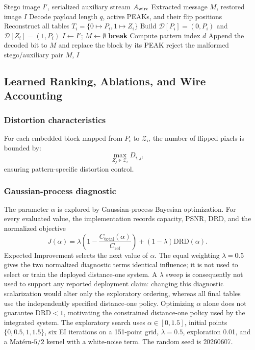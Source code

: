 \documentclass[a4paper,fleqn]{cas-dc}
\begin{document}
\begin{algorithm*}[t]
\caption{Deterministic Extraction and Exact Restoration}
\label{alg:extraction}
\begin{algorithmic}[1]
\Require Stego image $I'$, serialized auxiliary stream $A_{\rm wire}$
\Ensure Extracted message $M$, restored image $I$
\State Decode payload length $q$, active PEAKs, and their flip positions
\State Reconstruct all tables $T_i=\{0\mapsto P_i,1\mapsto Z_i\}$
\State Build $\mathcal D[P_i]=(0,P_i)$ and $\mathcal D[Z_i]=(1,P_i)$
\State $I\gets I'$; $M\gets\emptyset$
        \State \textbf{break}
    \EndIf
    \State Compute pattern index $d$
        \State Append the decoded bit to $M$ and replace the block by its PEAK
    \EndIf
\EndFor
{}
    \State reject the malformed stego/auxiliary pair
\EndIf
\State \Return $M$, $I$
\end{algorithmic}
\end{algorithm*}

\subsection{Learned Ranking, Ablations, and Wire Accounting}

\subsubsection*{Distortion characteristics}

For each embedded block mapped from $P_i$ to $\mathcal{Z}_i$, the number of flipped pixels is bounded by:
\[
\max_{Z_j \in \mathcal{Z}_i} D_{i,j},
\]
ensuring pattern-specific distortion control.

\subsubsection*{Gaussian-process diagnostic}
\label{subsec:param_optim}

The parameter $\alpha$ is explored by Gaussian-process Bayesian optimization.
For every evaluated value, the implementation records capacity, PSNR, DRD, and
the normalized objective
\[
J(\alpha)=\lambda\left(1-\frac{C_{\text{total}}(\alpha)}{C_{\mathrm{ref}}}\right)
+(1-\lambda)\mathrm{DRD}(\alpha).
\]
Expected Improvement selects the next value of $\alpha$. The equal weighting
$\lambda=0.5$ gives the two normalized diagnostic terms identical influence;
it is not used to select or train the deployed distance-one system. A
$\lambda$ sweep is consequently not used to support any reported deployment
claim: changing this diagnostic scalarization would alter only the exploratory
ordering, whereas all final tables use the independently specified
distance-one policy. Optimizing $\alpha$ alone does not guarantee
$\mathrm{DRD}<1$, motivating the constrained distance-one policy used by the
integrated system. The exploratory search uses
$\alpha\in[0,1.5]$, initial points $\{0,0.5,1,1.5\}$, six EI iterations on a
151-point grid, $\lambda=0.5$, exploration 0.01, and a Matérn-$5/2$ kernel
with a white-noise term. The random seed is 20260607.
\end{document}
